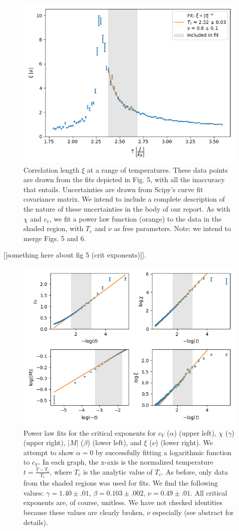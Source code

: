 \documentclass[letter,scriptaddress,twocolumn, prl,nofootinbib]{revtex4}
\begin{document}
\begin{figure}[h]
	\begin{center}
		\includegraphics[width=.4\textwidth]{figs/fig4_xi.png}
		\caption{Correlation length $\xi$ at a range of temperatures. These data points are drawn from the fits depicted in Fig. 5, with all the inaccuracy that entails. Uncertainties are drawn from Scipy's curve fit covariance matrix. We intend to include a complete description of the nature of these uncertainties in the body of our report. As with $\chi$ and $c_v$, we fit a power law function (orange) to the data in the shaded region, with $T_c$ and $\nu$ as free parameters. Note: we intend to merge Figs. 5 and 6.}
		\label{fig:fig4b}
	\end{center}
\end{figure}

[[something here about fig 5 (crit exponents)]].

\begin{figure}[h]
	\begin{center}
		\includegraphics[width=1\textwidth]{figs/lastfig.png}
		\caption{Power law fits for the critical exponents for $c_V$ ($\alpha$) (upper left), $\chi$ ($\gamma$) (upper right), $|M|$ ($\beta$) (lower left), and $\xi$ ($\nu$) (lower right). We attempt to show $\alpha = 0$ by successfully fitting a logarithmic function to $c_V$. In each graph, the x-axis is the normalized temperature $t = \frac{T - T_c}{T_c}$, where $T_c$ is the analytic value of $T_c$. As before, only data from the shaded regions was used for fits. We find the following values: $\gamma = 1.40 \pm .01$, $\beta = 0.103 \pm .002$, $\nu = 0.49 \pm .01$. All critical exponents are, of course, unitless. We have not checked identities because these values are clearly broken, $\nu$ especially (see abstract for details).}
		\label{fig:fig5}
	\end{center}
\end{figure}
\end{document}
